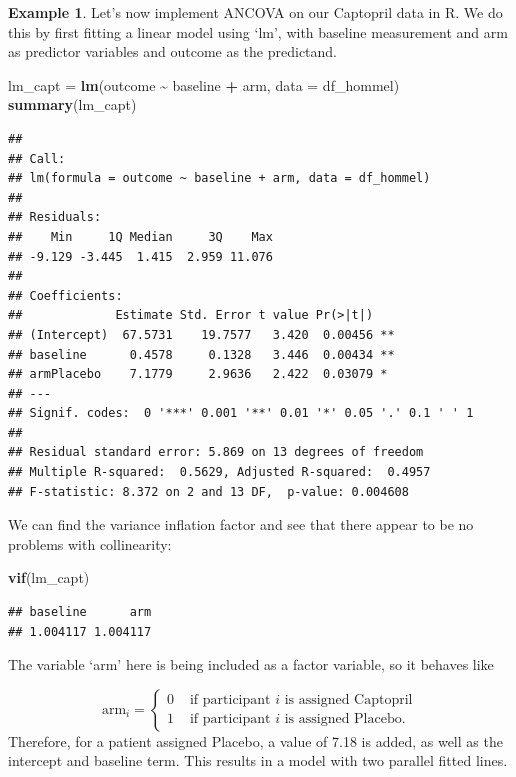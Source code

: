 \documentclass[
  openany]{book}
\newenvironment{Shaded}{\begin{snugshade}}{\end{snugshade}}
\newcommand{\AttributeTok}[1]{\textcolor[rgb]{0.13,0.29,0.53}{#1}}
\newcommand{\FunctionTok}[1]{\textcolor[rgb]{0.13,0.29,0.53}{\textbf{#1}}}
\newcommand{\NormalTok}[1]{#1}
\newcommand{\OtherTok}[1]{\textcolor[rgb]{0.56,0.35,0.01}{#1}}
\newcommand{\SpecialCharTok}[1]{\textcolor[rgb]{0.81,0.36,0.00}{\textbf{#1}}}
\theoremstyle{definition}
\theoremstyle{definition}
\newtheorem{example}{Example}[chapter]
\theoremstyle{definition}
\theoremstyle{definition}
\theoremstyle{remark}
\begin{document}
\begin{example}
Let's now implement ANCOVA on our Captopril data in R.
We do this by first fitting a linear model using `lm', with baseline measurement and arm as predictor variables and outcome as the predictand.

\begin{Shaded}
\begin{Highlighting}[]
\NormalTok{lm\_capt }\OtherTok{=} \FunctionTok{lm}\NormalTok{(outcome }\SpecialCharTok{\textasciitilde{}}\NormalTok{ baseline }\SpecialCharTok{+}\NormalTok{ arm, }\AttributeTok{data =}\NormalTok{ df\_hommel)}
\FunctionTok{summary}\NormalTok{(lm\_capt) }
\end{Highlighting}
\end{Shaded}

\begin{verbatim}
## 
## Call:
## lm(formula = outcome ~ baseline + arm, data = df_hommel)
## 
## Residuals:
##    Min     1Q Median     3Q    Max 
## -9.129 -3.445  1.415  2.959 11.076 
## 
## Coefficients:
##             Estimate Std. Error t value Pr(>|t|)   
## (Intercept)  67.5731    19.7577   3.420  0.00456 **
## baseline      0.4578     0.1328   3.446  0.00434 **
## armPlacebo    7.1779     2.9636   2.422  0.03079 * 
## ---
## Signif. codes:  0 '***' 0.001 '**' 0.01 '*' 0.05 '.' 0.1 ' ' 1
## 
## Residual standard error: 5.869 on 13 degrees of freedom
## Multiple R-squared:  0.5629, Adjusted R-squared:  0.4957 
## F-statistic: 8.372 on 2 and 13 DF,  p-value: 0.004608
\end{verbatim}

We can find the variance inflation factor and see that there appear to be no problems with collinearity:

\begin{Shaded}
\begin{Highlighting}[]
\FunctionTok{vif}\NormalTok{(lm\_capt)}
\end{Highlighting}
\end{Shaded}

\begin{verbatim}
## baseline      arm 
## 1.004117 1.004117
\end{verbatim}

The variable `arm' here is being included as a factor variable, so it behaves like

\[
\text{arm}_i =
\begin{cases}
0 & \text{ if participant }i\text{ is assigned Captopril}\\
1 & \text{ if participant }i\text{ is assigned Placebo}.
\end{cases}
\]
Therefore, for a patient assigned Placebo, a value of 7.18 is added, as well as the intercept and baseline term. This results in a model with two parallel fitted lines.


\end{example}
\end{document}
